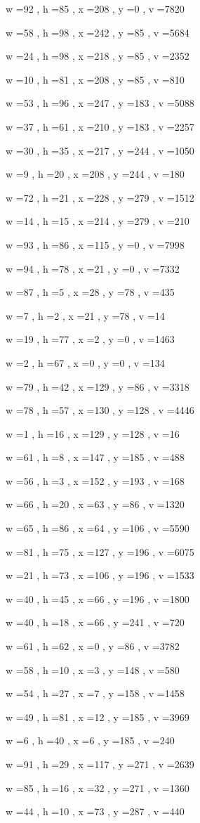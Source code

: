 \documentclass[11pt]{article}
\begin{document}
w =92 , h =85 , x =208 , y =0 , v =7820
\par
w =58 , h =98 , x =242 , y =85 , v =5684
\par
w =24 , h =98 , x =218 , y =85 , v =2352
\par
w =10 , h =81 , x =208 , y =85 , v =810
\par
w =53 , h =96 , x =247 , y =183 , v =5088
\par
w =37 , h =61 , x =210 , y =183 , v =2257
\par
w =30 , h =35 , x =217 , y =244 , v =1050
\par
w =9 , h =20 , x =208 , y =244 , v =180
\par
w =72 , h =21 , x =228 , y =279 , v =1512
\par
w =14 , h =15 , x =214 , y =279 , v =210
\par
w =93 , h =86 , x =115 , y =0 , v =7998
\par
w =94 , h =78 , x =21 , y =0 , v =7332
\par
w =87 , h =5 , x =28 , y =78 , v =435
\par
w =7 , h =2 , x =21 , y =78 , v =14
\par
w =19 , h =77 , x =2 , y =0 , v =1463
\par
w =2 , h =67 , x =0 , y =0 , v =134
\par
w =79 , h =42 , x =129 , y =86 , v =3318
\par
w =78 , h =57 , x =130 , y =128 , v =4446
\par
w =1 , h =16 , x =129 , y =128 , v =16
\par
w =61 , h =8 , x =147 , y =185 , v =488
\par
w =56 , h =3 , x =152 , y =193 , v =168
\par
w =66 , h =20 , x =63 , y =86 , v =1320
\par
w =65 , h =86 , x =64 , y =106 , v =5590
\par
w =81 , h =75 , x =127 , y =196 , v =6075
\par
w =21 , h =73 , x =106 , y =196 , v =1533
\par
w =40 , h =45 , x =66 , y =196 , v =1800
\par
w =40 , h =18 , x =66 , y =241 , v =720
\par
w =61 , h =62 , x =0 , y =86 , v =3782
\par
w =58 , h =10 , x =3 , y =148 , v =580
\par
w =54 , h =27 , x =7 , y =158 , v =1458
\par
w =49 , h =81 , x =12 , y =185 , v =3969
\par
w =6 , h =40 , x =6 , y =185 , v =240
\par
w =91 , h =29 , x =117 , y =271 , v =2639
\par
w =85 , h =16 , x =32 , y =271 , v =1360
\par
w =44 , h =10 , x =73 , y =287 , v =440
\par
\newpage
\end{document}

